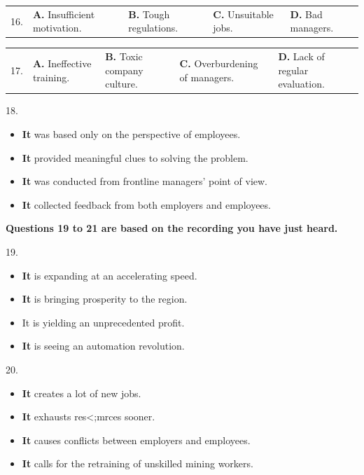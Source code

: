 \documentclass[UTF8,11pt]{ctexart}
\begin{document}
\noindent\begin{tabularx}{\linewidth}{@{}lXXXX@{}}16. & \textbf{A.} Insufficient motivation. & \textbf{B.} Tough regulations. & \textbf{C.} Unsuitable jobs. & \textbf{D.} Bad managers.\\\end{tabularx}\par

\noindent\begin{tabularx}{\linewidth}{@{}lXXXX@{}}17. & \textbf{A.} Ineffective training. & \textbf{B.} Toxic company culture. & \textbf{C.} Overburdening of managers. & \textbf{D.} Lack of regular evaluation.\\\end{tabularx}\par

18.


\begin{itemize}[leftmargin=2em,itemsep=.2em,topsep=.4em]\item[A.] \textbf{It }was based only on the perspective of employees.
\item[B.] \textbf{It }provided meaningful clues to solving the problem.
\item[C.] \textbf{It }was conducted from frontline managers' point of view.
\item[D.] \textbf{It }collected feedback from both employers and employees.
\end{itemize}

\textbf{Questions 19 to 21 are based on the recording you have just heard.}


19.


\begin{itemize}[leftmargin=2em,itemsep=.2em,topsep=.4em]\item[A.] \textbf{It }is expanding at an accelerating speed.
\item[B.] \textbf{It }is bringing prosperity to the region.
\item[C.] It is yielding an unprecedented profit.
\item[D.] \textbf{It }is seeing an automation revolution.
\end{itemize}

20.


\begin{itemize}[leftmargin=2em,itemsep=.2em,topsep=.4em]\item[A.] \textbf{It }creates a lot of new jobs.
\item[B.] \textbf{It }exhausts res<;mrces sooner.
\item[C.] \textbf{It }causes conflicts between employers and employees.
\item[D.] \textbf{It }calls for the retraining of unskilled mining workers.
\end{itemize}
\end{document}
